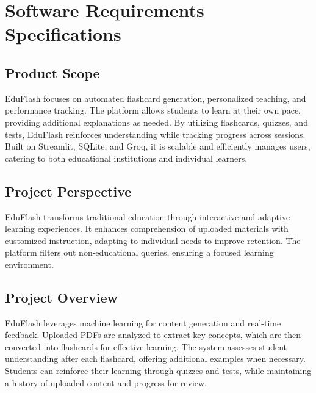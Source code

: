 \documentclass{report}
\begin{document}
\section{Software Requirements Specifications}

\subsection{Product Scope}
EduFlash focuses on automated flashcard generation, personalized teaching, and performance tracking. The platform allows students to learn at their own pace, providing additional explanations as needed. By utilizing flashcards, quizzes, and tests, EduFlash reinforces understanding while tracking progress across sessions. Built on Streamlit, SQLite, and Groq, it is scalable and efficiently manages users, catering to both educational institutions and individual learners.

\subsection{Project Perspective}
EduFlash transforms traditional education through interactive and adaptive learning experiences. It enhances comprehension of uploaded materials with customized instruction, adapting to individual needs to improve retention. The platform filters out non-educational queries, ensuring a focused learning environment.

\subsection{Project Overview}
EduFlash leverages machine learning for content generation and real-time feedback. Uploaded PDFs are analyzed to extract key concepts, which are then converted into flashcards for effective learning. The system assesses student understanding after each flashcard, offering additional examples when necessary. Students can reinforce their learning through quizzes and tests, while maintaining a history of uploaded content and progress for review.
\end{document}
